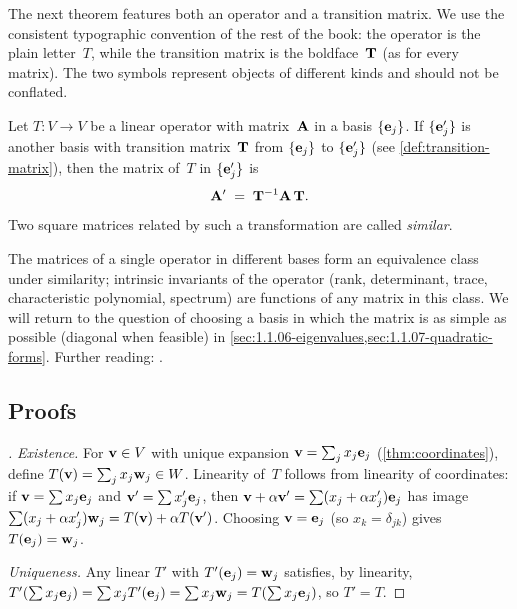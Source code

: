 \begin{remark}
\label{rem:operator-vs-transition-matrix}
The next theorem features both an operator and a transition matrix.
We use the consistent typographic convention of the rest of the book:
the operator is the plain letter~$T$, while the transition matrix
is the boldface~$\mathbf{T}$ (as for every matrix). The two symbols
represent objects of different kinds and should not be conflated.
\end{remark}

\begin{theorem}
\label{thm:operator-change-of-basis}
Let $T \colon V \to V$ be a linear operator with matrix~$\mathbf{A}$ in a
basis $\{\mathbf{e}_j\}$. If $\{\mathbf{e}'_j\}$ is another basis with
transition matrix~$\mathbf{T}$ from $\{\mathbf{e}_j\}$ to $\{\mathbf{e}'_j\}$
(see \cref{def:transition-matrix}), then the matrix of~$T$ in
$\{\mathbf{e}'_j\}$ is
\[
  \mathbf{A}' \;=\; \mathbf{T}^{-1} \mathbf{A}\, \mathbf{T}.
\]
Two square matrices related by such a transformation are called
\emph{similar}.
\end{theorem}

\begin{remark}
The matrices of a single operator in different bases form an
equivalence class under similarity; intrinsic invariants of the
operator (rank, determinant, trace, characteristic polynomial,
spectrum) are functions of any matrix in this class. We will return to
the question of choosing a basis in which the matrix is as simple as
possible (diagonal when feasible) in
\cref{sec:1.1.06-eigenvalues,sec:1.1.07-quadratic-forms}. Further
reading: \cite{Beklemishev2025}.
\end{remark}

\subsection*{Proofs}

\begin{proof}[]
\emph{Existence.} For $\mathbf{v} \in V$ with unique expansion
$\mathbf{v} = \sum_j x_j \mathbf{e}_j$ (\cref{thm:coordinates}), define
$T(\mathbf{v}) = \sum_j x_j \mathbf{w}_j \in W$. Linearity of~$T$ follows
from linearity of coordinates: if
$\mathbf{v} = \sum x_j \mathbf{e}_j$ and $\mathbf{v}' = \sum x'_j \mathbf{e}_j$,
then
$\mathbf{v} + \alpha \mathbf{v}' = \sum (x_j + \alpha x'_j) \mathbf{e}_j$ has
image $\sum (x_j + \alpha x'_j) \mathbf{w}_j = T(\mathbf{v}) + \alpha T(\mathbf{v}')$.
Choosing $\mathbf{v} = \mathbf{e}_j$ (so $x_k = \delta_{jk}$) gives
$T(\mathbf{e}_j) = \mathbf{w}_j$.

\emph{Uniqueness.} Any linear $T'$ with $T'(\mathbf{e}_j) = \mathbf{w}_j$
satisfies, by linearity,
$T'(\sum x_j \mathbf{e}_j) = \sum x_j T'(\mathbf{e}_j) = \sum x_j \mathbf{w}_j = T(\sum x_j \mathbf{e}_j)$,
so $T' = T$.
\end{proof}

